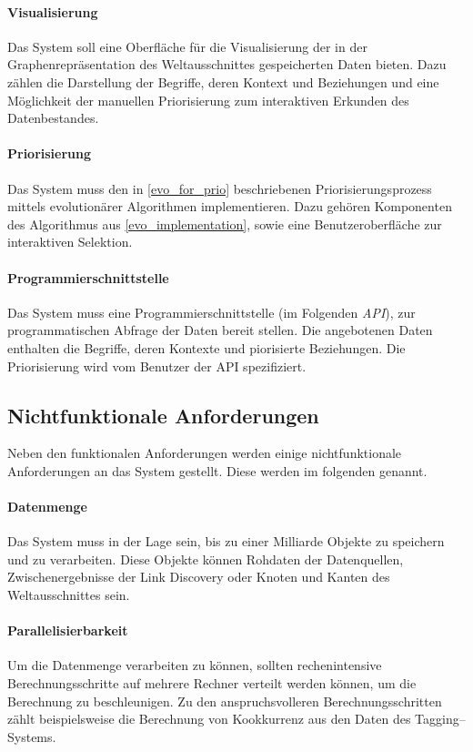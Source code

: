 \paragraph{Visualisierung} Das System soll eine Oberfläche für die Visualisierung der in der Graphenrepräsentation des Weltausschnittes gespeicherten Daten bieten. Dazu zählen die Darstellung der Begriffe, deren Kontext und Beziehungen und eine Möglichkeit der manuellen Priorisierung zum interaktiven Erkunden des Datenbestandes.

\paragraph{Priorisierung} Das System muss den in \cref{evo_for_prio} beschriebenen Priorisierungsprozess mittels evolutionärer Algorithmen implementieren. Dazu gehören Komponenten des Algorithmus aus \cref{evo_implementation}, sowie eine Benutzeroberfläche zur interaktiven Selektion.

\paragraph{Programmierschnittstelle} Das System muss eine Programmierschnittstelle (im Folgenden \emph{API}), zur programmatischen Abfrage der Daten bereit stellen. Die angebotenen Daten enthalten die Begriffe, deren Kontexte und piorisierte Beziehungen. Die Priorisierung wird vom Benutzer der API spezifiziert.

\subsection{Nichtfunktionale Anforderungen}

Neben den funktionalen Anforderungen werden einige nichtfunktionale Anforderungen an das System gestellt. Diese werden im folgenden genannt.

\paragraph{Datenmenge} Das System muss in der Lage sein, bis zu einer Milliarde Objekte zu speichern und zu verarbeiten. Diese Objekte können Rohdaten der Datenquellen, Zwischenergebnisse der Link Discovery oder Knoten und Kanten des Weltausschnittes sein.

\paragraph{Parallelisierbarkeit} Um die Datenmenge verarbeiten zu können, sollten rechenintensive Berechnungsschritte auf mehrere Rechner verteilt werden können, um die Berechnung zu beschleunigen. Zu den anspruchsvolleren Berechnungsschritten zählt beispielsweise die Berechnung von Kookkurrenz aus den Daten des Tagging--Systems.

